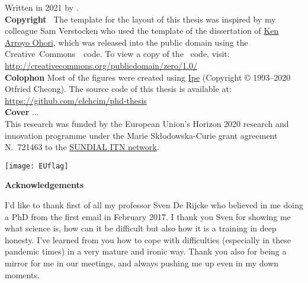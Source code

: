 \clearpage
\thispagestyle{empty}
\null%
\label{thesis:colophon}
\vfill
{}
\noindent Written in 2021 by {\makeatletter{\@author}\makeatother}.\\
\textbf{Copyright}~\cczero{} The template for the layout of this thesis was inspired by my colleague Sam Verstocken who used the template of the dissertation of \href{ken.mx}{Ken Arroyo Ohori},
which was released into the public domain using the Creative~Commons~\cczero{}~code.
To view a copy of the \cczero{}~code, visit:\\\url{http://creativecommons.org/publicdomain/zero/1.0/}\\
\textbf{Colophon}
Most of the figures were created using \href{http://ipe.otfried.org/}{Ipe} (Copyright © 1993–2020 Otfried Cheong).
The source code of this thesis is available at: \\
\url{https://github.com/elehcim/phd-thesis}\\
\textbf{Cover}
...\\[2ex]
This research was funded by the European Union's Horizon 2020 research and innovation programme under the Marie Sk\l odowska-Curie
grant agreement N.~721463 to the \href{www.astro.rug.nl/~sundial}{SUNDIAL ITN network}.
\begin{figure*}[bh!]
  \centering
  \texttt{[image: EUflag]}
\end{figure*}

\clearpage
\thispagestyle{empty}
\null%
\label{thesis:acknowledgements}
  \begin{center}
    {\Large \textbf{Acknowledgements}}\\
  \end{center}
I'd like to thank first of all my professor Sven De Rijcke who believed in me doing a PhD from the first email in February 2017. I thank you Sven for showing me what science is, how can it be difficult but also how it is a training in deep honesty.
I've learned from you how to cope with difficulties (especially in these pandemic times) in a very mature and ironic way.
Thank you also for being a mirror for me in our meetings, and always pushing me up even in my down moments.

